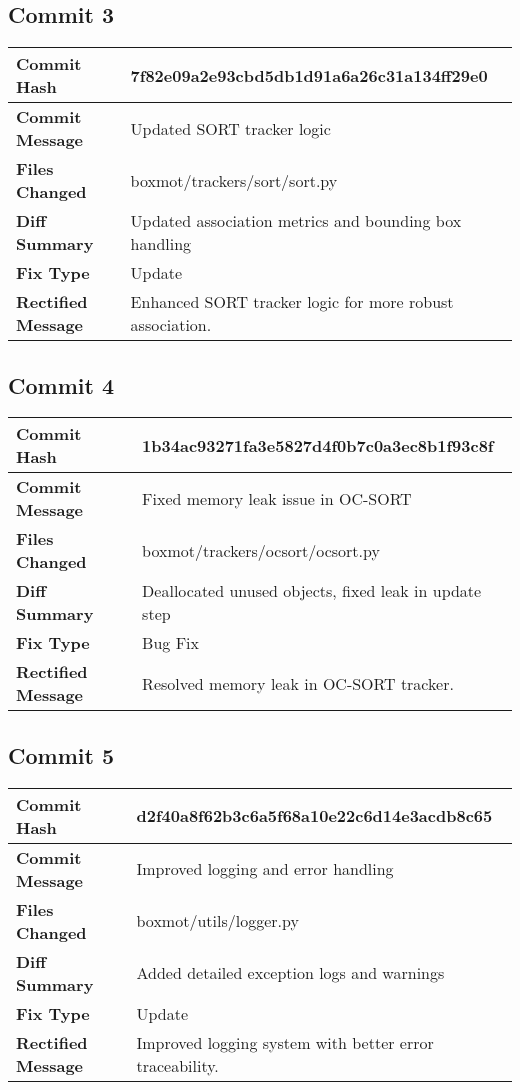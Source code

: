 \documentclass[12pt, a4paper]{report}
\begin{document}
\subsection*{Commit 3}
\begin{tabular}{|p{3cm}|p{10cm}|}
\hline
\textbf{Commit Hash} & 7f82e09a2e93cbd5db1d91a6a26c31a134ff29e0 \\
\hline
\textbf{Commit Message} & Updated SORT tracker logic \\
\hline
\textbf{Files Changed} & 
boxmot/trackers/sort/sort.py \\
\hline
\textbf{Diff Summary} & Updated association metrics and bounding box handling \\
\hline
\textbf{Fix Type} & Update \\
\hline
\textbf{Rectified Message} & Enhanced SORT tracker logic for more robust association. \\
\hline
\end{tabular}

\vspace{1cm}

\subsection*{Commit 4}
\begin{tabular}{|p{3cm}|p{10cm}|}
\hline
\textbf{Commit Hash} & 1b34ac93271fa3e5827d4f0b7c0a3ec8b1f93c8f \\
\hline
\textbf{Commit Message} & Fixed memory leak issue in OC-SORT \\
\hline
\textbf{Files Changed} & 
boxmot/trackers/ocsort/ocsort.py \\
\hline
\textbf{Diff Summary} & Deallocated unused objects, fixed leak in update step \\
\hline
\textbf{Fix Type} & Bug Fix \\
\hline
\textbf{Rectified Message} & Resolved memory leak in OC-SORT tracker. \\
\hline
\end{tabular}

\vspace{1cm}

\subsection*{Commit 5}
\begin{tabular}{|p{3cm}|p{10cm}|}
\hline
\textbf{Commit Hash} & d2f40a8f62b3c6a5f68a10e22c6d14e3acdb8c65 \\
\hline
\textbf{Commit Message} & Improved logging and error handling \\
\hline
\textbf{Files Changed} & 
boxmot/utils/logger.py \\
\hline
\textbf{Diff Summary} & Added detailed exception logs and warnings \\
\hline
\textbf{Fix Type} & Update \\
\hline
\textbf{Rectified Message} & Improved logging system with better error traceability. \\
\hline
\end{tabular}
\end{document}

